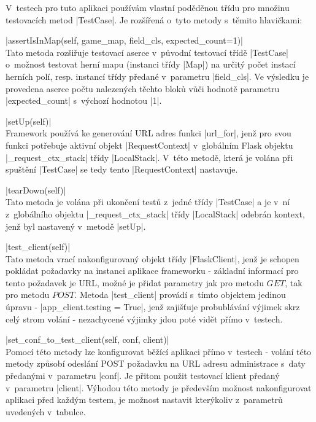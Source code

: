 V~testech pro tuto aplikaci používám vlastní poděděnou třídu pro množinu testovacích metod \ic|TestCase|. Je rozšířená o~tyto metody s~těmito hlavičkami:
\begin{description}
	\item \ic|assertIsInMap(self, game_map, field_cls, expected_count=1)| \\
	Tato metoda rozšiřuje testovací aserce v~původní testovací třídě \ic|TestCase| o~možnost testovat herní mapu (instanci třídy \ic|Map|) na určitý počet instací herních polí, resp. instancí třídy předané v~parametru \ic|field_cls|. Ve výsledku je provedena aserce počtu nalezených těchto bloků vůči hodnotě parametru \ic|expected_count| s~výchozí hodnotou \ic|1|.

    \item \ic|setUp(self)| \\
    Framework  používá ke generování URL adres funkci \ic|url_for|, jenž pro svou funkci potřebuje aktivní objekt \ic|RequestContext| v~globálním Flask objektu \ic|_request_ctx_stack| třídy \ic|LocalStack|. V~této metodě, která je volána při spuštění \ic|TestCase| se tedy tento \ic|RequestContext| nastavuje. 

    \item \ic|tearDown(self)| \\
    Tato metoda je volána při ukončení testů z~jedné třídy \ic|TestCase| a je v~ní z~globálního objektu \ic|_request_ctx_stack| třídy \ic|LocalStack| odebrán kontext, jenž byl nastavený v~metodě \ic|setUp|.

    \item \ic|test_client(self)| \\
    Tato metoda vrací nakonfigurovaný objekt třídy \ic|FlaskClient|, jenž je schopen pokládat požadavky na instanci aplikace frameworku  - základní informací pro tento požadavek je URL, možné je přidat parametry jak pro  metodu $GET$, tak pro metodu $POST$. Metoda \ic|test_client| provádí s~tímto objektem jedinou úpravu - \ic|app_client.testing = True|, jenž zajišťuje probublávání výjimek skrz celý strom volání - nezachycené výjimky jdou poté vidět přímo v~testech.

    \item \ic|set_conf_to_test_client(self, conf, client)| \\
    Pomocí této metody lze konfigurovat běžící aplikaci přímo v~testech - volání této metody způsobí odeslání POST požadavku na URL adresu administrace s~daty předanými v~parametru \ic|conf|. Je přitom použit testovací klient předaný v~parametru \ic|client|. Výhodou této metody je především možnost nakonfigurovat aplikaci před každým testem, je možnost nastavit kterýkoliv z~parametrů uvedených v~tabulce. 
\end{description}

